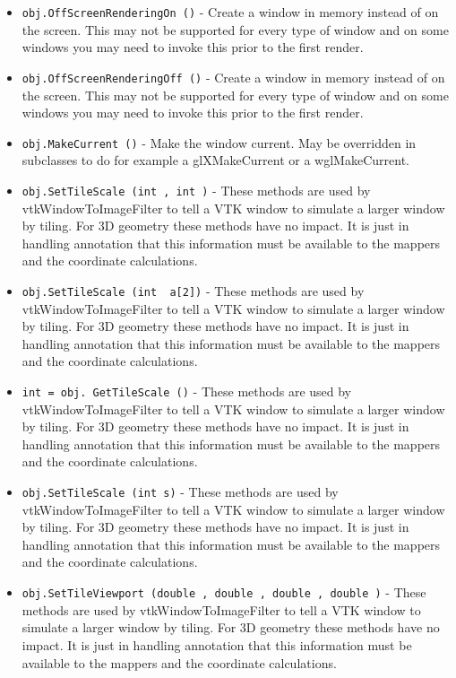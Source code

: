 \begin{itemize}
\item  \verb|obj.OffScreenRenderingOn ()| -  Create a window in memory instead of on the screen. This may not be
 supported for every type of window and on some windows you may need to
 invoke this prior to the first render.

\item  \verb|obj.OffScreenRenderingOff ()| -  Create a window in memory instead of on the screen. This may not be
 supported for every type of window and on some windows you may need to
 invoke this prior to the first render.

\item  \verb|obj.MakeCurrent ()| -  Make the window current. May be overridden in subclasses to do
 for example a glXMakeCurrent or a wglMakeCurrent.

\item  \verb|obj.SetTileScale (int , int )| -  These methods are used by vtkWindowToImageFilter to tell a VTK window
 to simulate a larger window by tiling. For 3D geometry these methods
 have no impact. It is just in handling annotation that this information
 must be available to the mappers and the coordinate calculations.

\item  \verb|obj.SetTileScale (int  a[2])| -  These methods are used by vtkWindowToImageFilter to tell a VTK window
 to simulate a larger window by tiling. For 3D geometry these methods
 have no impact. It is just in handling annotation that this information
 must be available to the mappers and the coordinate calculations.

\item  \verb|int = obj. GetTileScale ()| -  These methods are used by vtkWindowToImageFilter to tell a VTK window
 to simulate a larger window by tiling. For 3D geometry these methods
 have no impact. It is just in handling annotation that this information
 must be available to the mappers and the coordinate calculations.

\item  \verb|obj.SetTileScale (int s)| -  These methods are used by vtkWindowToImageFilter to tell a VTK window
 to simulate a larger window by tiling. For 3D geometry these methods
 have no impact. It is just in handling annotation that this information
 must be available to the mappers and the coordinate calculations.

\item  \verb|obj.SetTileViewport (double , double , double , double )| -  These methods are used by vtkWindowToImageFilter to tell a VTK window
 to simulate a larger window by tiling. For 3D geometry these methods
 have no impact. It is just in handling annotation that this information
 must be available to the mappers and the coordinate calculations.


\end{itemize}
